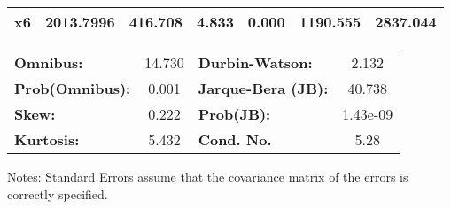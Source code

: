 \begin{center}
\begin{tabular}{lcccccc}
\textbf{x6}    &    2013.7996  &      416.708     &     4.833  &         0.000        &     1190.555    &     2837.044     \\
\bottomrule
\end{tabular}
\begin{tabular}{lclc}
\textbf{Omnibus:}       & 14.730 & \textbf{  Durbin-Watson:     } &    2.132  \\
\textbf{Prob(Omnibus):} &  0.001 & \textbf{  Jarque-Bera (JB):  } &   40.738  \\
\textbf{Skew:}          &  0.222 & \textbf{  Prob(JB):          } & 1.43e-09  \\
\textbf{Kurtosis:}      &  5.432 & \textbf{  Cond. No.          } &     5.28  \\
\bottomrule
\end{tabular}
\end{center}

Notes: \newline
 [1] Standard Errors assume that the covariance matrix of the errors is correctly specified.